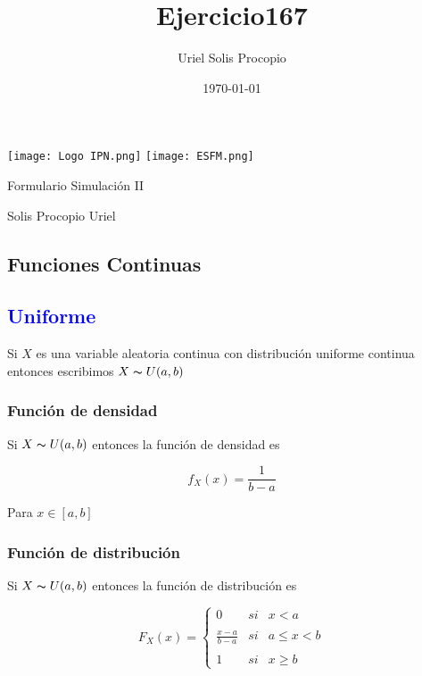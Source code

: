 \documentclass{article}
\title{Ejercicio167}
\author{Uriel Solis Procopio}
\date{\today}
\begin{document}
\thispagestyle{empty}
	
	\texttt{[image: Logo IPN.png]}
	\texttt{[image: ESFM.png]}
	
\begin{center}
        	
\LARGE
	Formulario  Simulación II
	
        	
\vspace{0.5cm}
\normalsize	
Solis Procopio Uriel 

\vspace{0.5cm}
\end{center}

\setcounter{page}{1}
\pagestyle{plain}

    \begin{multicols}{2}
    
    \section{Funciones Continuas}   

        \subsection{\textcolor{blue}{Uniforme}}

            Si $X$ es una variable aleatoria continua con distribución uniforme continua entonces escribimos $X \thicksim U(a,b)$

            \subsubsection{Función de densidad}

                Si $X\thicksim U(a,b)$ entonces la función de densidad es

                    \begin{equation*}
                        f_X (x) = \frac{1}{b-a}
                    \end{equation*}

                Para $x\in [a,b]$

            \subsubsection{Función de distribución}

                Si $X\thicksim U(a,b)$ entonces la función de distribución es

                    \begin{equation*}
                        F_X (x)= \left\{ \begin{array}{lcc}
                                 0 &   si  & x < a \\
                                 \\ \frac{x-a}{b-a} &  si & a \leq  x < b \\
                                 \\ 1 &  si  & x \geq b
                                 \end{array}
                                \right.
                    \end{equation*}
                    

\end{multicols}
\end{document}
